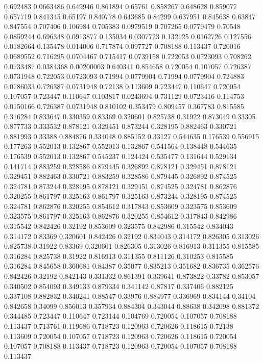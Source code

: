 0.692483 0.0663486
0.649946 0.861894
0.65761 0.858267
0.648628 0.859077
0.657719 0.841345
0.65197 0.840778
0.643685 0.84299
0.637951 0.845638
0.63847 0.847554
0.707406 0.106984
0.705383 0.0979519
0.707265 0.0779479
0.70548 0.0859244
0.696348 0.0913877
0.135034 0.0307723
0.132125 0.0162726
0.127556 0.0182664
0.135478 0.014006
0.717874 0.097727
0.708188 0.113437
0.720016 0.0689552
0.716295 0.0704467
0.715417 0.0739158
0.722053 0.0723093
0.708262 0.0733487
0.0384368 0.00200003
0.640341 0.854658
0.720054 0.107057
0.726387 0.0731948
0.722053 0.0723093
0.71994 0.0779904
0.71994 0.0779904
0.724883 0.0786033
0.726387 0.0731948
0.72138 0.113609
0.723447 0.110647
0.720054 0.107057
0.723447 0.110647
0.103817 0.0243694
0.731129 0.0723416
0.114753 0.0150166
0.726387 0.0731948
0.810102 0.353479
0.809457 0.367783
0.815585 0.316284
0.833647 0.330359
0.83369 0.320601
0.825738 0.31922
0.873049 0.33305
0.877733 0.333532
0.878121 0.329451
0.873244 0.328195
0.882463 0.330721
0.881993 0.33388
0.884876 0.334048
0.885152 0.33127
0.544635 0.176539
0.556915 0.177263
0.552013 0.132867
0.552013 0.132867
0.541564 0.138448
0.544635 0.176539
0.552013 0.132867
0.545237 0.124424
0.535477 0.131644
0.529134 0.141714
0.883259 0.328586
0.879445 0.326892
0.878121 0.329451
0.878121 0.329451
0.882463 0.330721
0.883259 0.328586
0.879445 0.326892
0.874525 0.324781
0.873244 0.328195
0.878121 0.329451
0.874525 0.324781
0.862876 0.320255
0.861797 0.325163
0.861797 0.325163
0.873244 0.328195
0.874525 0.324781
0.862876 0.320255
0.854612 0.317843
0.853609 0.323575
0.853609 0.323575
0.861797 0.325163
0.862876 0.320255
0.854612 0.317843
0.842986 0.315542
0.842426 0.32192
0.853609 0.323575
0.842986 0.315542
0.834043 0.314172
0.83369 0.320601
0.842426 0.32192
0.834043 0.314172
0.826305 0.313026
0.825738 0.31922
0.83369 0.320601
0.826305 0.313026
0.816913 0.311355
0.815585 0.316284
0.825738 0.31922
0.816913 0.311355
0.811126 0.310253
0.815585 0.316284
0.845658 0.360681
0.84387 0.35077
0.835213 0.351682
0.836735 0.362576
0.842426 0.32192
0.842143 0.331332
0.861391 0.339641
0.873822 0.33782
0.853057 0.340502
0.854093 0.349133
0.879334 0.341142
0.87817 0.337406
0.882125 0.337108
0.882832 0.340241
0.88547 0.33976
0.884977 0.336969
0.834144 0.34104
0.842658 0.34099
0.856013 0.357934
0.884304 0.343044
0.88638 0.342098
0.881372 0.344485
0.723447 0.110647
0.723144 0.104769
0.720054 0.107057
0.708188 0.113437
0.713761 0.119686
0.718723 0.120963
0.720626 0.118615
0.72138 0.113609
0.720054 0.107057
0.718723 0.120963
0.720626 0.118615
0.720054 0.107057
0.708188 0.113437
0.718723 0.120963
0.720054 0.107057
0.708188 0.113437
